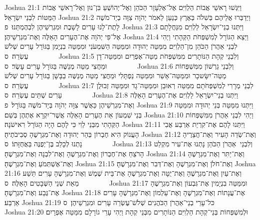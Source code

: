 Joshua 21:1	וַיִּגְּשׁוּ רָאשֵׁי אֲבוֹת הַלְוִיִּם אֶל־אֶלְעָזָר הַכֹּהֵן וְאֶל־יְהוֹשֻׁעַ בִּן־נוּן וְאֶל־רָאשֵׁי אֲבוֹת הַמַּטּוֹת לִבְנֵי יִשְׂרָאֵל׃
Joshua 21:2	וַיְדַבְּרוּ אֲלֵיהֶם בְּשִׁלֹה בְּאֶרֶץ כְּנַעַן לֵאמֹר יְהֹוָה צִוָּה בְיַד־מֹשֶׁה לָתֶת־לָנוּ עָרִים לָשָׁבֶת וּמִגְרְשֵׁיהֶן לִבְהֶמְתֵּנוּ׃ {פ}
Joshua 21:3	וַיִּתְּנוּ בְנֵי־יִשְׂרָאֵל לַלְוִיִּם מִנַּחֲלָתָם אֶל־פִּי יְהֹוָה אֶת־הֶעָרִים הָאֵלֶּה וְאֶת־מִגְרְשֵׁיהֶן׃
Joshua 21:4	וַיֵּצֵא הַגּוֹרָל לְמִשְׁפְּחֹת הַקְּהָתִי וַיְהִי לִבְנֵי אַהֲרֹן הַכֹּהֵן מִן־הַלְוִיִּם מִמַּטֵּה יְהוּדָה וּמִמַּטֵּה הַשִּׁמְעֹנִי וּמִמַּטֵּה בִנְיָמִן בַּגּוֹרָל עָרִים שְׁלֹשׁ עֶשְׂרֵה׃ {ס}        
Joshua 21:5	וְלִבְנֵי קְהָת הַנּוֹתָרִים מִמִּשְׁפְּחֹת מַטֵּה־אֶפְרַיִם וּמִמַּטֵּה־דָן וּמֵחֲצִי מַטֵּה מְנַשֶּׁה בַּגּוֹרָל עָרִים עָשֶׂר׃ {ס}        
Joshua 21:6	וְלִבְנֵי גֵרְשׁוֹן מִמִּשְׁפְּחוֹת מַטֵּה־יִשָּׂשכָר וּמִמַּטֵּה־אָשֵׁר וּמִמַּטֵּה נַפְתָּלִי וּמֵחֲצִי מַטֵּה מְנַשֶּׁה בַבָּשָׁן בַּגּוֹרָל עָרִים שְׁלֹשׁ עֶשְׂרֵה׃ {ס}        
Joshua 21:7	לִבְנֵי מְרָרִי לְמִשְׁפְּחֹתָם מִמַּטֵּה רְאוּבֵן וּמִמַּטֵּה־גָד וּמִמַּטֵּה זְבוּלֻן עָרִים שְׁתֵּים עֶשְׂרֵה׃ {ס}        
Joshua 21:8	וַיִּתְּנוּ בְנֵי־יִשְׂרָאֵל לַלְוִיִּם אֶת־הֶעָרִים הָאֵלֶּה וְאֶת־מִגְרְשֵׁיהֶן כַּאֲשֶׁר צִוָּה יְהֹוָה בְּיַד־מֹשֶׁה בַּגּוֹרָל׃ {פ}
Joshua 21:9	וַיִּתְּנוּ מִמַּטֵּה בְּנֵי יְהוּדָה וּמִמַּטֵּה בְּנֵי שִׁמְעוֹן אֵת הֶעָרִים הָאֵלֶּה אֲשֶׁר־יִקְרָא אֶתְהֶן בְּשֵׁם׃
Joshua 21:10	וַיְהִי לִבְנֵי אַהֲרֹן מִמִּשְׁפְּחוֹת הַקְּהָתִי מִבְּנֵי לֵוִי כִּי לָהֶם הָיָה הַגּוֹרָל רִאישֹׁנָה׃
Joshua 21:11	וַיִּתְּנוּ לָהֶם אֶת־קִרְיַת אַרְבַּע אֲבִי הָעֲנוֹק הִיא חֶבְרוֹן בְּהַר יְהוּדָה וְאֶת־מִגְרָשֶׁהָ סְבִיבֹתֶיהָ׃
Joshua 21:12	וְאֶת־שְׂדֵה הָעִיר וְאֶת־חֲצֵרֶיהָ נָתְנוּ לְכָלֵב בֶּן־יְפֻנֶּה בַּאֲחֻזָּתוֹ׃ {ס}        
Joshua 21:13	וְלִבְנֵי  אַהֲרֹן הַכֹּהֵן נָתְנוּ אֶת־עִיר מִקְלַט הָרֹצֵחַ אֶת־חֶבְרוֹן וְאֶת־מִגְרָשֶׁהָ וְאֶת־לִבְנָה וְאֶת־מִגְרָשֶׁהָ׃
Joshua 21:14	וְאֶת־יַתִּר וְאֶת־מִגְרָשֶׁהָ וְאֶת־אֶשְׁתְּמֹעַ וְאֶת־מִגְרָשֶׁהָ׃
Joshua 21:15	וְאֶת־חֹלֹן וְאֶת־מִגְרָשֶׁהָ וְאֶת־דְּבִר וְאֶת־מִגְרָשֶׁהָ׃
Joshua 21:16	וְאֶת־עַיִן וְאֶת־מִגְרָשֶׁהָ וְאֶת־יֻטָּה וְאֶת־מִגְרָשֶׁהָ אֶת־בֵּית שֶׁמֶשׁ וְאֶת־מִגְרָשֶׁהָ עָרִים תֵּשַׁע מֵאֵת שְׁנֵי הַשְּׁבָטִים הָאֵלֶּה׃ {ס}        
Joshua 21:17	וּמִמַּטֵּה בִנְיָמִין אֶת־גִּבְעוֹן וְאֶת־מִגְרָשֶׁהָ אֶת־גֶּבַע וְאֶת־מִגְרָשֶׁהָ׃
Joshua 21:18	אֶת־עֲנָתוֹת וְאֶת־מִגְרָשֶׁהָ וְאֶת־עַלְמוֹן וְאֶת־מִגְרָשֶׁהָ עָרִים אַרְבַּע׃
Joshua 21:19	כּל־עָרֵי בְנֵי־אַהֲרֹן הַכֹּהֲנִים שְׁלֹשׁ־עֶשְׂרֵה עָרִים וּמִגְרְשֵׁיהֶן׃ {ס}        
Joshua 21:20	וּלְמִשְׁפְּחוֹת בְּנֵי־קְהָת הַלְוִיִּם הַנּוֹתָרִים מִבְּנֵי קְהָת וַיְהִי עָרֵי גוֹרָלָם מִמַּטֵּה אֶפְרָיִם׃
